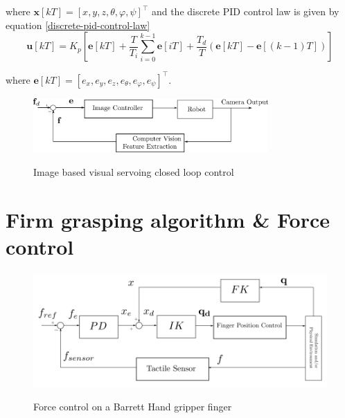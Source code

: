 where $\mathbf{x}[kT] = [x, y, z, θ, φ, ψ]^\top$ and the discrete PID control law is given by equation \ref{discrete-pid-control-law}
\begin{equation}
\label{discrete-pid-control-law}
\mathbf{u}[kT] = K_p \left[ \mathbf{e}[kT] + \frac{T}{T_i} \sum_{i=0}^{k-1} \mathbf{e}[iT] + \frac{T_d}{T} \left( \mathbf{e}[kT] - \mathbf{e}[(k-1)T] \right) \right]
\end{equation}

where $\mathbf{e}[kT] = [e_x, e_y, e_z, e_θ, e_φ, e_ψ]^\top$.

\begin{center}
\begin{figure}[!htb]
\centering
\includegraphics[width=0.8\textwidth]{images/visual-servoing-image-based.png}\\
\caption{Image based visual servoing closed loop control}
\label{visual-servoing-image-based-control}
\end{figure}
\end{center}


\section{Firm grasping algorithm \& Force control}

\begin{center}
\begin{figure}[!htb]
\centering
\includegraphics[width=12cm]{images/finger-force-control.png}\\
\caption{Force control on a Barrett Hand gripper finger}
\end{figure}
\end{center}